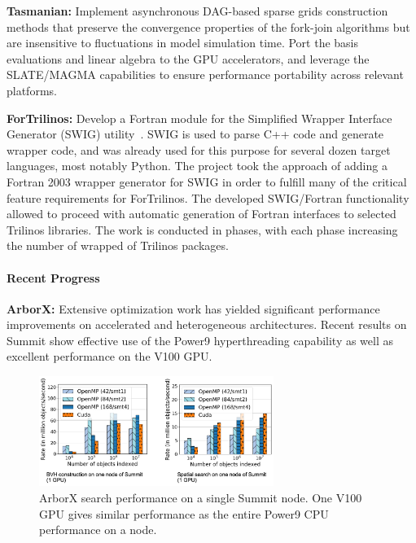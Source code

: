 {\bf Tasmanian:} Implement asynchronous DAG-based sparse grids construction
methods that preserve the convergence properties of the fork-join algorithms
but are insensitive to fluctuations in model simulation time.  Port the basis
evaluations and linear algebra to the GPU accelerators, and leverage the
SLATE/MAGMA capabilities to ensure performance portability across relevant
platforms.

{\bf ForTrilinos:} Develop a Fortran module for the Simplified Wrapper
Interface Generator (SWIG) utility~\cite{beazley1996swig}. SWIG is used to parse
C++ code and generate wrapper code, and was already used for this purpose for
several dozen target languages, most notably Python. The project took the
approach of adding a Fortran 2003 wrapper generator for SWIG in order to
fulfill many of the critical feature requirements for ForTrilinos.
The developed SWIG/Fortran functionality allowed to proceed with automatic
generation of Fortran interfaces to selected Trilinos libraries. The work is
conducted in phases, with each phase increasing the number of wrapped of
Trilinos packages.


\paragraph{Recent Progress}

\indent

{\bf ArborX:} Extensive optimization work has yielded significant performance
improvements on accelerated and heterogeneous architectures. Recent results on
Summit show effective use of the Power9 hyperthreading capability as well as
excellent performance on the V100 GPU.

\begin{figure}[htb]
        \centering \includegraphics[width=3.0in]{projects/2.3.3-MathLibs/2.3.3.14-ALExa-ForTrilinos/arborx_summit.png} \caption{\label{fig:arborx-gpu}
        ArborX search performance on a single Summit node. One V100 GPU gives
        similar performance as the entire Power9 CPU performance on a node.}
\end{figure}

